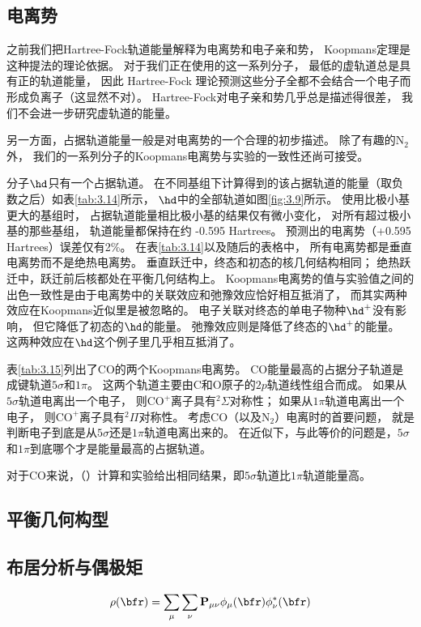 \subsection{电离势}
之前我们把Hartree-Fock轨道能量解释为电离势和电子亲和势，
Koopmans定理是这种提法的理论依据。 
对于我们正在使用的这一系列分子，
最低的虚轨道总是具有正的轨道能量，
因此 Hartree-Fock 理论预测这些分子全都不会结合一个电子而形成负离子（这显然不对）。 
Hartree-Fock对电子亲和势几乎总是描述得很差，
我们不会进一步研究虚轨道的能量。

另一方面，占据轨道能量一般是对电离势的一个合理的初步描述。
除了有趣的$\mathrm{N_2}$外，
我们的一系列分子的Koopmans电离势与实验的一致性还尚可接受。

分子$\hd$只有一个占据轨道。
在不同基组下计算得到的该占据轨道的能量（取负数之后）如表\autoref{tab:3.14}所示，
$\hd$中的全部轨道如图\autoref{fig:3.9}所示。
使用比极小基更大的基组时，
占据轨道能量相比极小基的结果仅有微小变化，
对所有超过极小基的那些基组，
轨道能量都保持在约 -0.595 Hartrees。
预测出的电离势（+0.595 Hartrees）误差仅有2\%。
在表\autoref{tab:3.14}以及随后的表格中，
所有电离势都是垂直电离势而不是绝热电离势。
垂直跃迁中，终态和初态的核几何结构相同；
绝热跃迁中，跃迁前后核都处在平衡几何结构上。
Koopmans电离势的值与实验值之间的出色一致性是由于电离势中的关联效应和弛豫效应恰好相互抵消了，
而其实两种效应在Koopmans近似里是被忽略的。
电子关联对终态的单电子物种$\hd^+$没有影响，
但它降低了初态的$\hd$的能量。
弛豫效应则是降低了终态的$\hd^+$的能量。
这两种效应在$\hd$这个例子里几乎相互抵消了。

表\autoref{tab:3.15}列出了$\mathrm{CO}$的两个Koopmans电离势。
$\mathrm{CO}$能量最高的占据分子轨道是成键轨道$5\sigma$和$1\pi$。
这两个轨道主要由C和O原子的$2p$轨道线性组合而成。
如果从$5\sigma$轨道电离出一个电子，
则$\mathrm{CO}^+$离子具有$\mbox{}^2\Sigma$对称性；
如果从$1\pi$轨道电离出一个电子，
则$\mathrm{CO}^+$离子具有$\mbox{}^2\Pi$对称性。
考虑$\mathrm{CO}$（以及$\mathrm{N}_2$）电离时的首要问题，
就是判断电子到底是从$5\sigma$还是$1\pi$轨道电离出来的。
在\hft 近似下，与此等价的问题是，$5\sigma$和$1\pi$到底哪个才是能量最高的占据轨道。

对于$\mathrm{CO}$来说，（\hft）计算和实验给出相同结果，即$5\sigma$轨道比$1\pi$轨道能量高。


\subsection{平衡几何构型}
\subsection{布居分析与偶极矩}
\begin{align}
	\rho(\bfr)=\sum_\mu\sum_\nu \mathbf{P}_{\mu\nu}\phi_\mu(\bfr)\phi^*_\nu(\bfr)
\end{align}
